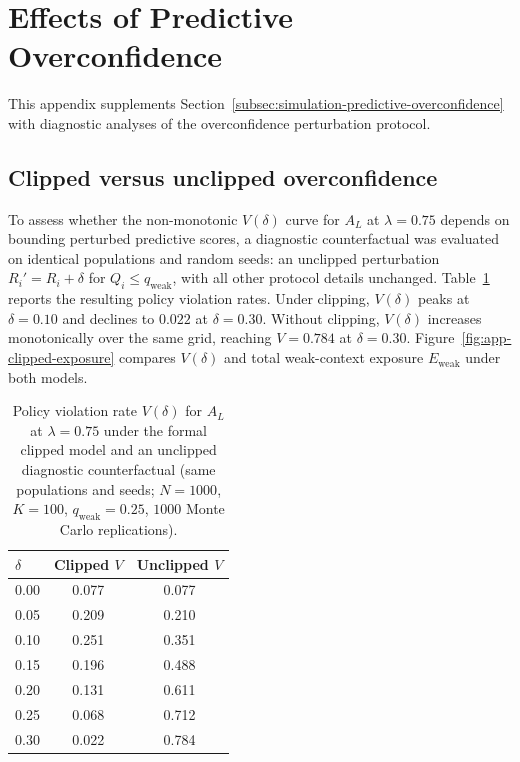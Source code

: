 \documentclass[mathematics,article,submit,moreauthors]{Definitions/mdpi}
\begin{document}

\appendixstart
\appendix
\section[\appendixname~\thesection]{Effects of Predictive Overconfidence}
\label{app:predictive-overconfidence}

This appendix supplements Section~\ref{subsec:simulation-predictive-overconfidence}
with diagnostic analyses of the overconfidence perturbation protocol.

\subsection[\appendixname~\thesubsection]{Clipped versus unclipped overconfidence}
\label{app:clipped-unclipped}

To assess whether the non-monotonic $V(\delta)$ curve for $A_L$ at
$\lambda=0.75$ depends on bounding perturbed predictive scores, a
diagnostic counterfactual was evaluated on identical populations and
random seeds: an unclipped perturbation
$R_i'=R_i+\delta$ for $Q_i\le q_{\mathrm{weak}}$, with all other
protocol details unchanged. Table~\ref{tab:app-clipped-unclipped}
reports the resulting policy violation rates. Under clipping,
$V(\delta)$ peaks at $\delta=0.10$ and declines to $0.022$ at
$\delta=0.30$. Without clipping, $V(\delta)$ increases monotonically
over the same grid, reaching $V=0.784$ at $\delta=0.30$.
Figure~\ref{fig:app-clipped-exposure} compares $V(\delta)$ and total
weak-context exposure $E_{\mathrm{weak}}$ under both models.

\begin{table}[H]
\caption{Policy violation rate $V(\delta)$ for $A_L$ at $\lambda=0.75$
under the formal clipped model and an unclipped diagnostic counterfactual
(same populations and seeds; $N=1000$, $K=100$, $q_{\mathrm{weak}}=0.25$,
$1000$ Monte Carlo replications).}
\label{tab:app-clipped-unclipped}
\centering
\small
\renewcommand{\arraystretch}{1.2}
\begin{tabular}{lcc}
\toprule
$\delta$ & Clipped $V$ & Unclipped $V$ \\
\midrule
0.00 & 0.077 & 0.077 \\
0.05 & 0.209 & 0.210 \\
0.10 & 0.251 & 0.351 \\
0.15 & 0.196 & 0.488 \\
0.20 & 0.131 & 0.611 \\
0.25 & 0.068 & 0.712 \\
0.30 & 0.022 & 0.784 \\
\bottomrule
\end{tabular}
\end{table}
\end{document}
